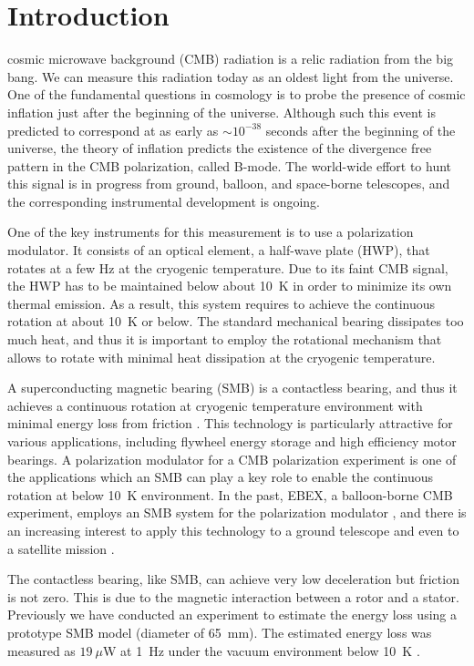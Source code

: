 \documentclass[iournal]{IEEEtran}
\begin{document}
\section{Introduction}
 cosmic microwave background (CMB) radiation is a relic radiation from the big bang.
We can measure this radiation today as an oldest light from the universe.
One of the fundamental questions in cosmology is to probe the presence of cosmic inflation just after the beginning of the universe.
Although such this event is predicted to correspond at as early as $\sim10^{-38}$ seconds after the beginning of the universe, the theory of inflation predicts the existence of the divergence free pattern in the CMB polarization, called B-mode.
The world-wide effort to hunt this signal is in progress from ground, balloon, and space-borne telescopes, and the corresponding instrumental development is ongoing.

One of the key instruments for this measurement is to use a polarization modulator.
It consists of an optical element, a half-wave plate (HWP), that rotates at a few Hz at the cryogenic temperature.
Due to its faint CMB signal, the HWP has to be maintained below about 10~K in order to minimize its own thermal emission.
As a result, this system requires to achieve the continuous rotation at about 10~K or below.
The standard mechanical bearing dissipates too much heat, and thus it is important to employ the rotational mechanism that allows to rotate with minimal heat dissipation at the cryogenic temperature.

A superconducting magnetic bearing (SMB) is a contactless bearing, and thus it achieves a continuous rotation at cryogenic temperature environment with minimal energy loss from friction \cite{hull_review}.
This technology is particularly attractive for various applications, including flywheel energy storage and high efficiency motor bearings.
A polarization modulator for a CMB polarization experiment is one of the applications which an SMB can play a key role to enable the continuous rotation at below 10~K environment.
In the past, EBEX, a balloon-borne CMB experiment, employs an SMB system for the polarization modulator \cite{jklein}, and there is an increasing interest to apply this technology to a ground telescope and even to a satellite mission \cite{litebird}.

The contactless bearing, like SMB, can achieve very low deceleration but friction is not zero.
This is due to the magnetic interaction between a rotor and a stator.
Previously we have conducted an experiment to estimate the energy loss using a prototype SMB model (diameter of 65~mm).
The estimated energy loss was measured as $19~\mu$W at 1~Hz under the vacuum environment below 10~K \cite{matsumura_eucas2015}.
\end{document}
